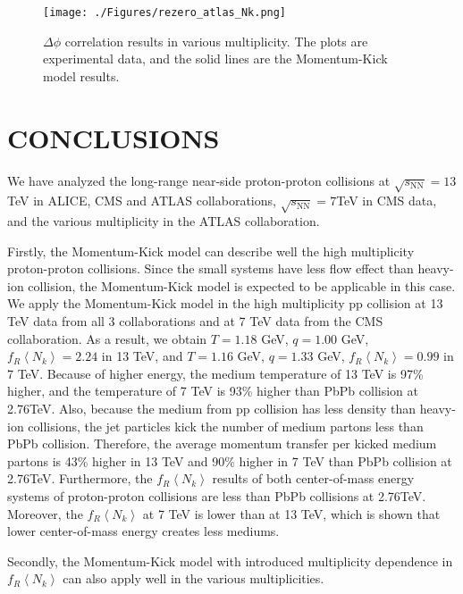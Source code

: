 \documentclass[jkps,fleqn,showpacs,showkeys]{revtex4}
\begin{document}
\begin{figure}[ht]
\centering
\texttt{[image: ./Figures/rezero\_atlas\_Nk.png]}
\caption{$\Delta \phi$ correlation results in various multiplicity.
The plots are experimental data, and the solid lines are the Momentum-Kick model results.
}
\label{figure:variousmulti}
\end{figure}



\section*{CONCLUSIONS}
\label{sec:Conclusion}


We have analyzed the long-range near-side proton-proton collisions at $\sqrt{s_\text{NN}}=13$TeV in ALICE, CMS and ATLAS collaborations\cite{alice, cms, atlas}, $\sqrt{s_\text{NN}}=7$TeV in CMS data\cite{cms}, and the various multiplicity in the ATLAS collaboration\cite{atlas}.

Firstly, the Momentum-Kick model can describe well the high multiplicity proton-proton collisions.
Since the small systems have less flow effect than heavy-ion collision, the Momentum-Kick model is expected to be applicable in this case.
We apply the Momentum-Kick model in the high multiplicity pp collision at 13 TeV data from all 3 collaborations and at 7 TeV data from the CMS collaboration. 
As a result, we obtain $T=1.18$ GeV, $q=1.00$ GeV, $f_R\left\langle N_k\right\rangle = 2.24$ in 13 TeV, and $T=1.16$ GeV, $q=1.33$ GeV, $f_R\left\langle N_k\right\rangle = 0.99$ in 7 TeV.
Because of higher energy, the medium temperature of 13 TeV is 97\% higher, and the temperature of 7 TeV is 93\% higher than PbPb collision at 2.76TeV.
Also, because the medium from pp collision has less density than heavy-ion collisions, the jet particles kick the number of medium partons less than PbPb collision.
Therefore, the average momentum transfer per kicked medium partons is 43\% higher in 13 TeV and 90\% higher in 7 TeV than PbPb collision at 2.76TeV.
Furthermore, the $f_R\left\langle N_k\right\rangle$ results of both center-of-mass energy systems of proton-proton collisions are less than PbPb collisions at 2.76TeV.
Moreover, the $f_R\left\langle N_k\right\rangle$ at 7 TeV is lower than at 13 TeV, which is shown that lower center-of-mass energy creates less mediums.


Secondly, the Momentum-Kick model with introduced multiplicity dependence in $f_R\left\langle N_k\right\rangle$ can also apply well in the various multiplicities.
\end{document}
